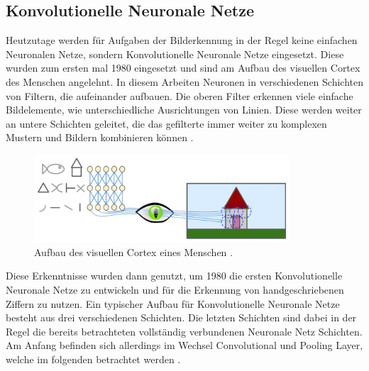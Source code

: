 \documentclass[11pt,bibliography=totocnumbered]{scrartcl}
\begin{document}
\subsection{Konvolutionelle Neuronale Netze}
Heutzutage werden für Aufgaben der Bilderkennung in der Regel keine einfachen Neuronalen Netze, sondern Konvolutionelle Neuronale Netze eingesetzt. Diese wurden zum ersten mal 1980 eingesetzt und sind am Aufbau des visuellen Cortex des Menschen angelehnt. In diesem Arbeiten Neuronen in verschiedenen Schichten von Filtern, die aufeinander aufbauen. Die oberen Filter erkennen viele einfache Bildelemente, wie unterschiedliche Ausrichtungen von Linien. Diese werden weiter an untere Schichten geleitet, die das gefilterte immer weiter zu komplexen Mustern und Bildern kombinieren können \cite[S.360]{MACHINE_LEARNING}. 
\begin{figure}[H]
	\centering
	\includegraphics[width=0.85\textwidth]{visueller_cortex}
	\vspace*{-3mm}
	\caption[Aufbau des visuellen Cortex]{Aufbau des visuellen Cortex eines Menschen \cite[S.360]{MACHINE_LEARNING}.}
	\label{fig:visueller_cortex}
\end{figure}
\vspace*{-5mm}
Diese Erkenntnisse wurden dann genutzt, um 1980 die ersten Konvolutionelle Neuronale Netze zu entwickeln und für die Erkennung von handgeschriebenen Ziffern zu nutzen. Ein typischer Aufbau für Konvolutionelle Neuronale Netze besteht aus drei verschiedenen Schichten. Die letzten Schichten sind dabei in der Regel die bereits betrachteten vollständig verbundenen Neuronale Netz Schichten. Am Anfang befinden sich allerdings im Wechsel Convolutional und Pooling Layer, welche im folgenden betrachtet werden \cite[S.361]{MACHINE_LEARNING}.
\end{document}
